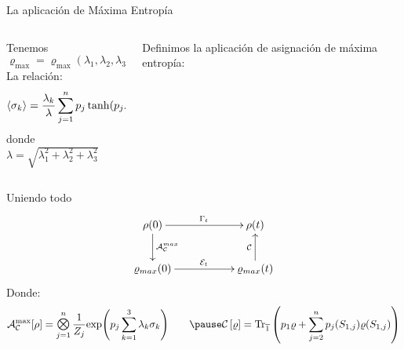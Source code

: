\begin{frame}{La aplicación de Máxima Entropía}
    \begin{columns}
        \begin{column}{0.5\textwidth}
            Tenemos
            \begin{equation}
                \varrho_{\max}=\varrho_{\max}(\lambda_{1},\lambda_{2},\lambda_{3})\nonumber
            \end{equation}\pause
            La relación:
            \begin{equation}
                \expval{\sigma_{k}}=\frac{\lambda_{k}}{\lambda}\sum_{j=1}^{n}p_{j}\tanh(p_{j}\lambda)\nonumber
            \end{equation}\pause
            donde $\lambda=\sqrt{\lambda_{1}^{2}+\lambda_{2}^{2}+\lambda_{3}^{2}}$
        \end{column}
        \pause
        \begin{column}{0.5\textwidth}
            Definimos la aplicación de asignación de máxima entropía:\pause
        \end{column}
    \end{columns}
\end{frame}


\begin{frame}{Uniendo todo}
    \begin{displaymath}
        \xymatrix{
          {\rho(0)} \ar[rr]^{\Gamma_{t}} \ar[d]^{\mcA^{max}_{\mcC}}
          && {\rho(t)}\\
          {\varrho_{max}(0)} \ar[rr]^{\mcE_{t}}
          && {\varrho_{max}(t)} \ar[u]^{\mcC}
        }
      \end{displaymath}\pause
      Donde:
        \begin{equation}
            \mcA_{\mcC}^{\max}[\rho]=\Motimes_{j=1}^{n}\frac{1}{Z_{j}}\text{exp}\qty(p_{j}\sum_{k=1}^{3}\lambda_{k}\sigma_{k}) \qquad \pause \CG{\varrho}=\Tr_{\overline{1}}\qty(p_{1}\varrho+\sum_{j=2}^{n}p_{j}(S_{1,j})\varrho(S_{1,j}))\nonumber
        \end{equation}\pause
        \begin{center}
        \end{center}
\end{frame}
